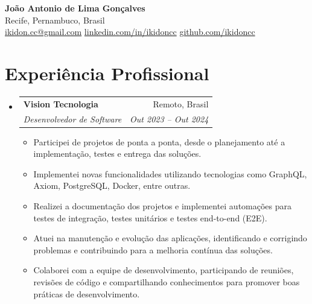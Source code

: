 \documentclass[letterpaper,10pt]{article}
\makeatletter
\newcommand{\resumeItem}[2]{
  \item\small{
    \textbf{#1}{: #2 \vspace{-2pt}}
  }
}
\newcommand{\resumeSubheading}[4]{
  \vspace{-1pt}\item
    \begin{tabular*}{0.97\textwidth}[t]{l@{\extracolsep{\fill}}r}
      \textbf{#1} & #2 \\
      \textit{\small #3} & \textit{\small #4} \\
    \end{tabular*}\vspace{-5pt}
}
\newcommand{\resumeSubSubheading}[2]{
    \begin{tabular*}{0.97\textwidth}{l@{\extracolsep{\fill}}r}
      \textit{\small #1} & \textit{\small #2} \\
    \end{tabular*}\vspace{-5pt}
}
\newcommand{\resumeItemPlain}[1]{
  \item\small{
    {#1 \vspace{-2pt}}
  }
}
\newcommand{\resumeSubHeadingListStart}{\begin{itemize}[leftmargin=*]}
\newcommand{\resumeSubHeadingListEnd}{\end{itemize}}
\newcommand{\resumeItemListStart}{\begin{itemize}}
\newcommand{\resumeItemListEnd}{\end{itemize}\vspace{-5pt}}
\makeatother
\begin{document}
\begin{center}
  \textbf{\LARGE João Antonio de Lima Gonçalves} \\ \vspace{4pt}
  \small Recife, Pernambuco, Brasil \\ \vspace{4pt}
  \small \href{mailto:ikidon.cc@gmail.com}{ikidon.cc@gmail.com} \textbar{} \href{https://www.linkedin.com/in/ikidoncc/}{linkedin.com/in/ikidoncc} \textbar{} \href{https://github.com/ikidoncc}{github.com/ikidoncc}
\end{center}

\section{Experiência Profissional}
  \resumeSubHeadingListStart

    \resumeSubheading
      {Vision Tecnologia}{Remoto, Brasil}
      {Desenvolvedor de Software}{Out 2023 -- Out 2024}
      \resumeItemListStart
        \resumeItemPlain
          {Participei de projetos de ponta a ponta, desde o planejamento até a implementação, testes e entrega das soluções.}
        \resumeItemPlain
          {Implementei novas funcionalidades utilizando tecnologias como GraphQL, Axiom, PostgreSQL, Docker, entre outras.}
        \resumeItemPlain
          {Realizei a documentação dos projetos e implementei automações para testes de integração, testes unitários e testes end-to-end (E2E).}
        \resumeItemPlain
          {Atuei na manutenção e evolução das aplicações, identificando e corrigindo problemas e contribuindo para a melhoria contínua das soluções.}
        \resumeItemPlain
          {Colaborei com a equipe de desenvolvimento, participando de reuniões, revisões de código e compartilhando conhecimentos para promover boas práticas de desenvolvimento.}
      \resumeItemListEnd
      


  \resumeSubHeadingListEnd


\end{document}
